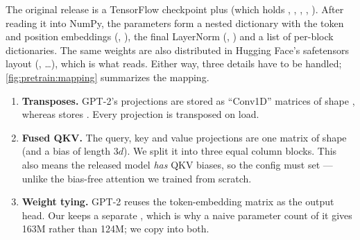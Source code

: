 The original release is a TensorFlow checkpoint plus  (which holds
, , , , ).
After reading it into NumPy, the parameters form a nested dictionary with the token and
position embeddings (, ), the final LayerNorm (, ) and a
list of per-block dictionaries. The same weights are also distributed in Hugging Face's
safetensors layout (, \ldots), which is what
 reads. Either way, three details have to be
handled; \cref{fig:pretrain:mapping} summarizes the mapping.

\begin{enumerate}
\item \textbf{Transposes.} GPT-2's projections are stored as ``Conv1D'' matrices of shape
  , whereas  stores . Every projection is
  transposed on load.
\item \textbf{Fused QKV.} The query, key and value projections are one matrix  of
  shape  (and a bias of length $3d$). We split it into three equal column blocks.
  This also means the released model \emph{has} QKV biases, so the config must set
  ---unlike the bias-free attention we trained from scratch.
\item \textbf{Weight tying.} GPT-2 reuses the token-embedding matrix as the output head. Our
   keeps a separate , which is why a naive parameter count of it
  gives 163M rather than 124M; we copy  into both.
\end{enumerate}

